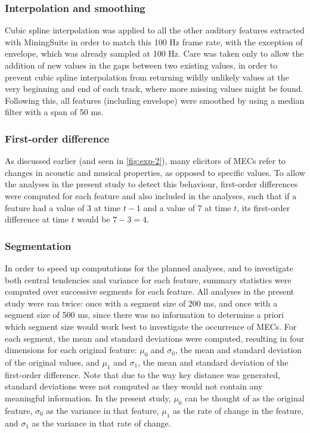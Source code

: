 \subsubsection{Interpolation and smoothing}

Cubic spline interpolation was applied to all the other auditory features extracted with MiningSuite in order to match this 100 Hz frame rate, with the exception of envelope, which was already sampled at 100 Hz. Care was taken only to allow the addition of new values in the gaps between two existing values, in order to prevent cubic spline interpolation from returning wildly unlikely values at the very beginning and end of each track, where more missing values might be found. Following this, all features (including envelope) were smoothed by using a median filter with a span of 50 ms.

\subsubsection{First-order difference}

As discussed earlier (and seen in \autoref{fig:exp-2}), many elicitors of MECs refer to changes in acoustic and musical properties, as opposed to specific values. To allow the analyses in the present study to detect this behaviour, first-order differences were computed for each feature and also included in the analyses, such that if a feature had a value of 3 at time $t - 1$ and a value of 7 at time $t$, its first-order difference at time $t$ would be $7 - 3 = 4$.

\subsubsection{Segmentation}

In order to speed up computations for the planned analyses, and to investigate both central tendencies and variance for each feature, summary statistics were computed over successive segments for each feature. All analyses in the present study were ran twice: once with a segment size of 200 ms, and once with a segment size of 500 ms, since there was no information to determine a priori which segment size would work best to investigate the occurrence of MECs. For each segment, the mean and standard deviations were computed, resulting in four dimensions for each original feature: $\mu_0$ and $\sigma_0$, the mean and standard deviation of the original values, and $\mu_1$ and $\sigma_1$, the mean and standard deviation of the first-order difference. Note that due to the way key distance was generated, standard deviations were not computed as they would not contain any meaningful information. In the present study, $\mu_0$ can be thought of as the original feature, $\sigma_0$ as the variance in that feature, $\mu_1$ as the rate of change in the feature, and $\sigma_1$ as the variance in that rate of change.

